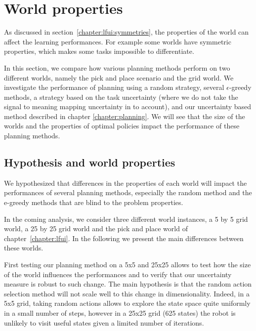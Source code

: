 
\section{World properties}
\label{chapter:limitations:wordlproperties}


As discussed in section~\ref{chapter:lfui:symmetries}, the properties of the world can affect the learning performances. For example some worlds have symmetric properties, which makes some tasks impossible to differentiate.

In this section, we compare how various planning methods perform on two different worlds, namely the pick and place scenario and the grid world. We investigate the performance of planning using a random strategy, several $\epsilon$-greedy methods, a strategy based on the task uncertainty (where we do not take the signal to meaning mapping uncertainty in to account), and our uncertainty based method described in chapter \ref{chapter:planning}. We will see that the size of the worlds and the properties of optimal policies impact the performance of these planning methods.

\subsection{Hypothesis and world properties}

We hypothesized that differences in the properties of each world will impact the performances of several planning methods, especially the random method and the e-greedy methods that are blind to the problem properties.

In the coming analysis, we consider three different world instances, a 5 by 5 grid world, a 25 by 25 grid world and the pick and place world of chapter~\ref{chapter:lfui}. In the following we present the main differences between these worlds.

First testing our planning method on a 5x5 and 25x25 allows to test how the size of the world influences the performances and to verify that our uncertainty measure is robust to such change. The main hypothesis is that the random action selection method will not scale well to this change in dimensionality. Indeed, in a 5x5 grid, taking random actions allows to explore the state space quite uniformly in a small number of steps, however in a 25x25 grid (625 states) the robot is unlikely to visit useful states given a limited number of iterations.

